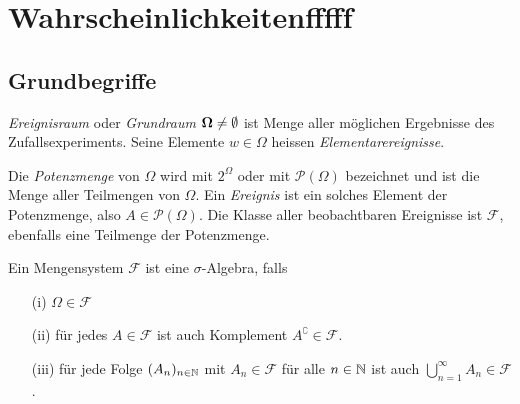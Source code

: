 \setcounter{section}{0} %

\section{Wahrscheinlichkeitenfffff}

\subsection{Grundbegriffe}
\begin{definition}
\textit{Ereignisraum} oder \textit{Grundraum} $\boldsymbol{\Omega} \neq \emptyset$ ist Menge aller möglichen Ergebnisse des Zufallsexperiments. Seine Elemente $w\in \Omega$ heissen \textit{Elementarereignisse}.
\end{definition} 

\begin{definition}
Die \textit{Potenzmenge} von $\Omega$ wird mit $2^\Omega$ oder mit $\mathcal{P}(\Omega)$ bezeichnet und ist die Menge aller Teilmengen von $\Omega$. Ein \textit{Ereignis} ist ein solches Element der Potenzmenge, also $A\in\mathcal{P}(\Omega)$. Die Klasse aller beobachtbaren Ereignisse ist $\mathcal{F}$, ebenfalls eine Teilmenge der Potenzmenge.
\end{definition}

\begin{definition}
Ein Mengensystem $\mathcal{F}$ ist eine $\sigma$-Algebra, falls
\begin{itemize}
\item[(i)] $\Omega \in \mathcal{F}$
\item[(ii)] für jedes $A\in\mathcal{F}$ ist auch Komplement $A^\complement \in \mathcal{F}$. 
\item[(iii)] für jede Folge $(A_n)_{n\in\mathbb{N}}$ mit $A_n \in \mathcal{F}$ für alle $n\in \mathbb{N}$ ist auch $\bigcup_{n=1}^\infty A_n \in \mathcal{F}$.
\end{itemize}
\end{definition}

